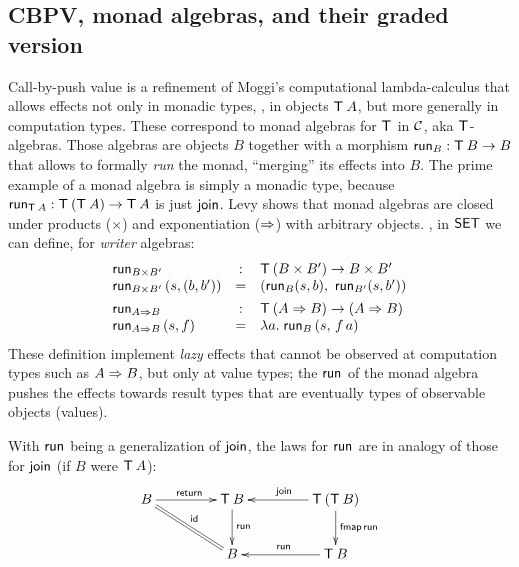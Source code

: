 \documentclass[acmsmall,review,anonymous]{acmart}\settopmatter{printfolios=true,printccs=false,printacmref=false}
\theoremstyle{remark}
\begin{document}
\subsection{CBPV, monad algebras, and their graded version}
\label{sec:graded_algebra}

Call-by-push value \cite{levy:hosc06} is a refinement of Moggi's
computational lambda-calculus \citeyearpar{moggi:infcomp91} that allows effects
not only in monadic types, \ie, in objects $\T\,A$, but more generally
in computation types.  These correspond to monad algebras for $\T$ in $\CC$,
aka $\T$-algebras.
Those algebras are objects $B$ together with a morphism $\run[B] : \T\,B
\to B$ that allows to formally \emph{run} the monad, ``merging'' its
effects into $B$.
The prime example of a monad algebra is simply a monadic
type, because $\run[\T\,A] : \T\,(\T\,A) \to \T\,A$ is just
$\tjoin$.  Levy \citeyearpar{levy:hosc06} shows that monad algebras are
closed under products ($\times$) and exponentiation ($\To$)
with arbitrary objects.  \Eg,
in $\SET$ we can define, for \emph{writer} algebras:
\[
\begin{array}{lcl}
  \run[B \times B'] & : & \T\,(B \times B') \to B \times B' \\
  \run[B \times B']\, (s,(b,b')) & = & (\run[B] (s,b),\
                                           \run[B'] (s,b'))
\\[1ex]
  \run[A \To B] & : & \T\,(A \To B) \to (A \To B) \\
  \run[A \To B]\, (s,f) & = & \lambda a.\; \run[B]\,(s,\,f\,a)
\\
\end{array}
\]
These definition implement \emph{lazy} effects that cannot be observed
at computation types such as $A \To B$, but only at value types; the
$\run[]$ of the monad algebra pushes the effects towards result types
that are eventually types of observable objects (values).

With $\run[]$ being a generalization of $\tjoin$, the laws for $\run[]$
are in analogy of those for $\tjoin$ (if $B$ were $\T\,A$):
\[
\xymatrix@C=10ex{
  B     \ar[r]^{\treturn} \ar@{=}[dr]^{\tid}
& \T\,B \ar[d]^{\run[]}
& \T\,(\T\,B) \ar[l]_{\tjoin} \ar[d]^{\tfmap\,\run[]}
\\
& B
& \T\,B \ar[l]_{\run[]}
}
\]
\end{document}
